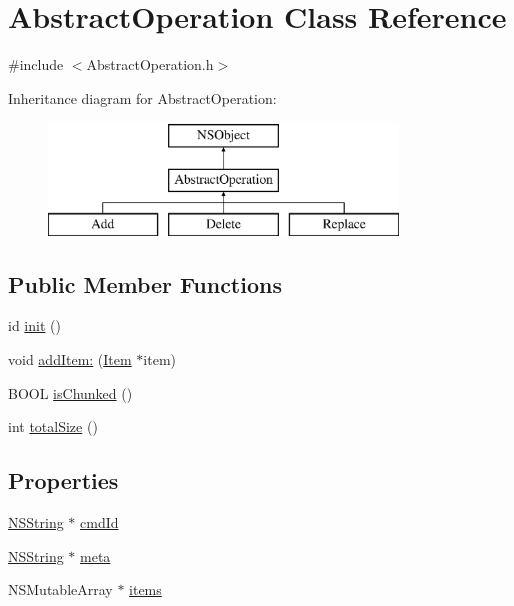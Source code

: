 \hypertarget{interface_abstract_operation}{
\section{\-Abstract\-Operation \-Class \-Reference}
\label{interface_abstract_operation}
}


{\ttfamily \#include $<$\-Abstract\-Operation.\-h$>$}

\-Inheritance diagram for \-Abstract\-Operation\-:\begin{figure}[H]
\begin{center}
\leavevmode
\includegraphics[height=3.000000cm]{interface_abstract_operation}
\end{center}
\end{figure}
\subsection*{\-Public \-Member \-Functions}
\begin{DoxyCompactItemize}
\item 
id \hyperlink{interface_abstract_operation_ab2a18c595a3e2c0215370029d3b8aeb4}{init} ()
\item 
void \hyperlink{interface_abstract_operation_a26caacf26abf8335713fe1cfb5620062}{add\-Item\-:} (\hyperlink{interface_item}{\-Item} $\ast$item)
\item 
\-B\-O\-O\-L \hyperlink{interface_abstract_operation_a75e1b8c8f64ee5ace1131eaaf89c255f}{is\-Chunked} ()
\item 
int \hyperlink{interface_abstract_operation_a873415f4d1c342ea1af7aca8cfcd2a00}{total\-Size} ()
\end{DoxyCompactItemize}
\subsection*{\-Properties}
\begin{DoxyCompactItemize}
\item 
\hyperlink{class_n_s_string}{\-N\-S\-String} $\ast$ \hyperlink{interface_abstract_operation_a3955773058501927fa2a4debf969b0ff}{cmd\-Id}
\item 
\hyperlink{class_n_s_string}{\-N\-S\-String} $\ast$ \hyperlink{interface_abstract_operation_af793a90da11b1d69d26c6a84a4e8fc34}{meta}
\item 
\-N\-S\-Mutable\-Array $\ast$ \hyperlink{interface_abstract_operation_a7892f6d43f9daccd8b797eae45116197}{items}
\end{DoxyCompactItemize}


